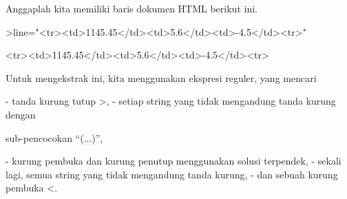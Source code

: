 \documentclass[a4paper,10pt]{article}
\begin{document}
\begin{eulernotebook}
\begin{eulercomment}
\begin{eulercomment}
\begin{eulercomment}
\begin{eulercomment}
\begin{eulercomment}
\begin{eulercomment}
\begin{eulercomment}
\begin{eulercomment}
\begin{eulercomment}
\begin{eulercomment}
\begin{eulercomment}
\begin{eulercomment}
\begin{eulercomment}
\begin{eulercomment}
\begin{eulercomment}
\begin{eulercomment}
\begin{eulercomment}
\begin{eulercomment}
\begin{eulercomment}
\begin{eulercomment}
\begin{eulercomment}
\begin{eulercomment}
\begin{eulercomment}
\begin{eulercomment}
\begin{eulercomment}
Anggaplah kita memiliki baris dokumen HTML berikut ini.
\end{eulercomment}
\begin{eulerprompt}
>line="<tr><td>1145.45</td><td>5.6</td><td>-4.5</td><tr>"
\end{eulerprompt}
\begin{euleroutput}
  <tr><td>1145.45</td><td>5.6</td><td>-4.5</td><tr>
\end{euleroutput}
\begin{eulercomment}
Untuk mengekstrak ini, kita menggunakan ekspresi reguler, yang mencari

\end{eulercomment}
\begin{eulerttcomment}
 - tanda kurung tutup >,
 - setiap string yang tidak mengandung tanda kurung dengan
\end{eulerttcomment}
\begin{eulercomment}
sub-pencocokan “(...)”,\\
\end{eulercomment}
\begin{eulerttcomment}
 - kurung pembuka dan kurung penutup menggunakan solusi terpendek,
 - sekali lagi, semua string yang tidak mengandung tanda kurung,
 - dan sebuah kurung pembuka <.
\end{eulerttcomment}
\begin{eulercomment}


\end{eulercomment}
\end{eulercomment}
\end{eulercomment}
\end{eulercomment}
\end{eulercomment}
\end{eulercomment}
\end{eulercomment}
\end{eulercomment}
\end{eulercomment}
\end{eulercomment}
\end{eulercomment}
\end{eulercomment}
\end{eulercomment}
\end{eulercomment}
\end{eulercomment}
\end{eulercomment}
\end{eulercomment}
\end{eulercomment}
\end{eulercomment}
\end{eulercomment}
\end{eulercomment}
\end{eulercomment}
\end{eulercomment}
\end{eulercomment}
\end{eulercomment}
\end{eulernotebook}
\end{document}
